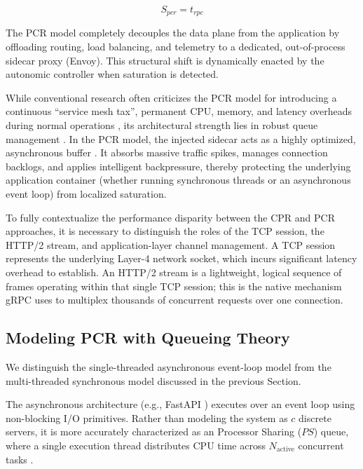 \documentclass{ieeeaccess}
\begin{document}
	\begin{equation}
		S_{pcr} = t_{rpc}
	\end{equation}
	
	
	
	The PCR model completely decouples the data plane from the application by offloading routing, load balancing, and telemetry to a dedicated, out-of-process sidecar proxy (Envoy). This structural shift is dynamically enacted by the autonomic controller when saturation is detected.
	
	While conventional research often criticizes the PCR model for introducing a continuous ``service mesh tax'', permanent CPU, memory, and latency overheads during normal operations \cite{chen2025trade,zhang2026adaptive}, its architectural strength lies in robust queue management \cite{xiang2024cost}. In the PCR model, the injected sidecar acts as a highly optimized, asynchronous buffer \cite{santos2018analyzing}. It absorbs massive traffic spikes, manages connection backlogs, and applies intelligent backpressure, thereby protecting the underlying application container (whether running synchronous threads or an asynchronous event loop) from localized saturation.
	
	To fully contextualize the performance disparity between the CPR and PCR approaches, it is necessary to distinguish the roles of the TCP session, the HTTP/2 stream, and application-layer channel management. A TCP session represents the underlying Layer-4 network socket, which incurs significant latency overhead to establish. An HTTP/2 stream is a lightweight, logical sequence of frames operating within that single TCP session; this is the native mechanism gRPC uses to multiplex thousands of concurrent requests over one connection.
	
	
	\subsection{Modeling PCR with Queueing Theory}
	
	
	We distinguish the single-threaded asynchronous event-loop model from the multi-threaded synchronous model discussed in the previous Section.
	
	The asynchronous architecture (e.g., FastAPI \cite{uvicorn}) executes over an event loop using non-blocking I/O primitives. Rather than modeling the system as $c$ discrete servers, it is more accurately characterized as an  Processor Sharing ($PS$) queue, where a single execution thread distributes CPU time across $N_{\text{active}}$ concurrent tasks \cite{dalai2024novel}.
	
\end{document}
